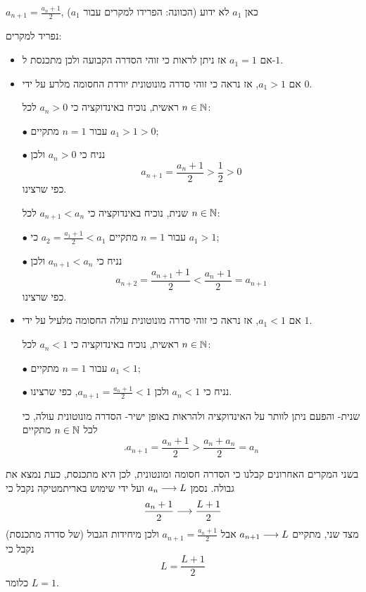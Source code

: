 \item
$a_{n+1}=\frac{a_n+1}{2}$,
כאן
$a_1$
לא ידוע
(הכוונה: הפרידו למקרים עבור
$a_1$)
\begin{solbox}
נפריד למקרים:
\begin{itemize}
\item
אם
$a_1=1$
אז ניתן לראות כי זוהי הסדרה הקבועה ולכן
מתכנסת ל-$1$.
\item
אם
$a_1>1$,
אז נראה כי זוהי סדרה מונוטונית יורדת החסומה מלרע על ידי
$0$.

ראשית, נוכיח באינדוקציה כי
$a_n>0$
לכל
$n\in\mathbb{N}$:

$\bullet$
עבור
$n=1$
מתקיים
$a_1>1>0$;

$\bullet$
נניח כי
$a_n>0$
ולכן
$$a_{n+1}=
\frac{a_n+1}{2}>\frac{1}{2}>0$$
כפי שרצינו.

שנית, נוכיח באינדוקציה כי
$a_{n+1}<a_n$
לכל
$n\in\mathbb{N}$:

$\bullet$
עבור
$n=1$
מתקיים
$a_2=\frac{a_1+1}{2}<a_1$
כי
$a_1>1$;

$\bullet$
נניח כי
$a_{n+1}<a_n$
ולכן
$$a_{n+2}=\frac{a_{n+1}+1}{2}<\frac{a_n+1}{2}=a_{n+1}$$
כפי שרצינו.
\item
אם
$a_1<1$,
אז נראה כי זוהי סדרה מונוטונית עולה החסומה מלעיל על ידי
$1$.

ראשית, נוכיח באינדוקציה כי
$a_n<1$
לכל
$n\in\mathbb{N}$:

$\bullet$
עבור
$n=1$
מתקיים
$a_1<1$;

$\bullet$
נניח כי
$a_n<1$
ולכן
$a_{n+1}=\frac{a_n+1}{2}<1$,
כפי שרצינו.

שנית- והפעם ניתן לוותר על האינדוקציה ולהראות באופן ישיר- הסדרה מונוטונית עולה, כי לכל
$n\in\mathbb{N}$
מתקיים
$$.a_{n+1}=\frac{a_n+1}{2}>\frac{a_n+a_n}{2}=a_n$$
\end{itemize}

בשני המקרים האחרונים קבלנו כי הסדרה חסומה ומונטונית, לכן היא מתכנסת, כעת נמצא את גבולה.
נסמן
$a_n\longrightarrow L$
ועל ידי שימוש באריתמטיקה נקבל כי
$$\frac{a_n+1}{2}\longrightarrow\frac{L+1}{2}$$
מצד שני, מתקיים
$a_{n+1}\longrightarrow L$
אבל
$a_{n+1}=\frac{a_n+1}{2}$
ולכן מיחידות הגבול (של סדרה מתכנסת) נקבל כי
$$L=\frac{L+1}{2}$$
כלומר $L=1$.
\end{solbox}
\eE
